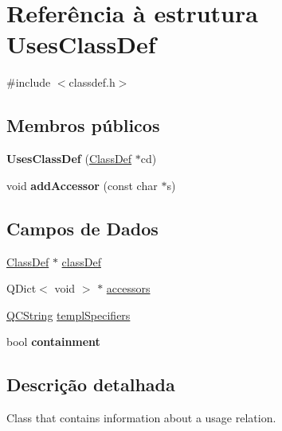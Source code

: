 \hypertarget{struct_uses_class_def}{\section{Referência à estrutura Uses\-Class\-Def}
\label{struct_uses_class_def}
}


{\ttfamily \#include $<$classdef.\-h$>$}

\subsection*{Membros públicos}
\begin{DoxyCompactItemize}
\item 
\hypertarget{struct_uses_class_def_a8740f45007525b6b9116ee5677a704a4}{{\bfseries Uses\-Class\-Def} (\hyperlink{class_class_def}{Class\-Def} $\ast$cd)}\label{struct_uses_class_def_a8740f45007525b6b9116ee5677a704a4}

\item 
\hypertarget{struct_uses_class_def_ab5f7399b4c648819c0269a3809e8d9c2}{void {\bfseries add\-Accessor} (const char $\ast$s)}\label{struct_uses_class_def_ab5f7399b4c648819c0269a3809e8d9c2}

\end{DoxyCompactItemize}
\subsection*{Campos de Dados}
\begin{DoxyCompactItemize}
\item 
\hyperlink{class_class_def}{Class\-Def} $\ast$ \hyperlink{struct_uses_class_def_a9ecae2706174bc69faacb7156966b12e}{class\-Def}
\item 
Q\-Dict$<$ void $>$ $\ast$ \hyperlink{struct_uses_class_def_a09840d2953c15cffee45345c1937d048}{accessors}
\item 
\hyperlink{class_q_c_string}{Q\-C\-String} \hyperlink{struct_uses_class_def_aea659c4ea8200bb40a20fa289d5acc72}{templ\-Specifiers}
\item 
\hypertarget{struct_uses_class_def_a566e2fa7dbad7700a003e5c0a23aa747}{bool {\bfseries containment}}\label{struct_uses_class_def_a566e2fa7dbad7700a003e5c0a23aa747}

\end{DoxyCompactItemize}


\subsection{Descrição detalhada}
Class that contains information about a usage relation. 

